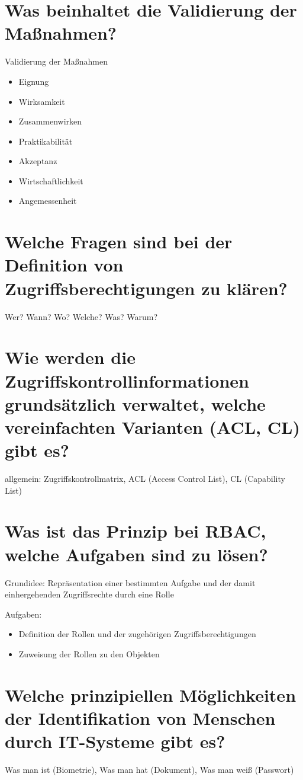 \documentclass{article}
\begin{document}
	\section*{Was beinhaltet die Validierung der Maßnahmen?}
	Validierung der Maßnahmen
	\begin{itemize}
		\item Eignung
		\item Wirksamkeit
		\item Zusammenwirken
		\item Praktikabilität
		\item Akzeptanz
		\item Wirtschaftlichkeit
		\item Angemessenheit
	\end{itemize}
	
	\section*{Welche Fragen sind bei der Definition von Zugriffsberechtigungen zu klären?}
	Wer? Wann? Wo? Welche? Was? Warum?
	
	\section*{Wie werden die Zugriffskontrollinformationen grundsätzlich verwaltet, welche vereinfachten Varianten (ACL, CL) gibt es?}
	allgemein: Zugriffskontrollmatrix, ACL (Access Control List), CL (Capability List)
	
	\section*{Was ist das Prinzip bei RBAC, welche Aufgaben sind zu lösen?}
	Grundidee: Repräsentation einer bestimmten Aufgabe und der damit einhergehenden Zugriffsrechte durch eine Rolle
	
	Aufgaben:
	\begin{itemize}
		\item Definition der Rollen und der zugehörigen Zugriffsberechtigungen
		\item Zuweisung der Rollen zu den Objekten
	\end{itemize}
	
	\section*{Welche prinzipiellen Möglichkeiten der Identifikation von Menschen durch IT-Systeme gibt es?}
	Was man ist (Biometrie), Was man hat (Dokument), Was man weiß (Passwort)
	
\end{document}

